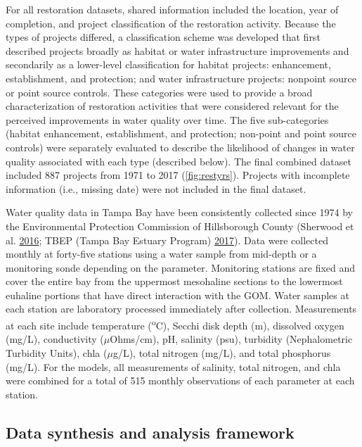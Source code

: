 \documentclass[]{article}
\begin{document}
For all restoration datasets, shared information included the location,
year of completion, and project classification of the restoration
activity. Because the types of projects differed, a classification
scheme was developed that first described projects broadly as habitat or
water infrastructure improvements and secondarily as a lower-level
classification for habitat projects: enhancement, establishment, and
protection; and water infrastructure projects: nonpoint source or point
source controls. These categories were used to provide a broad
characterization of restoration activities that were considered relevant
for the perceived improvements in water quality over time. The five
sub-categories (habitat enhancement, establishment, and protection;
non-point and point source controls) were separately evaluated to
describe the likelihood of changes in water quality associated with each
type (described below). The final combined dataset included 887 projects
from 1971 to 2017 (\cref{fig:restyrs}). Projects with incomplete
information (i.e., missing date) were not included in the final dataset.

Water quality data in Tampa Bay have been consistently collected since
1974 by the Environmental Protection Commission of Hillsborough County
(Sherwood et al. \protect\hyperlink{ref-Sherwood16}{2016}; TBEP (Tampa
Bay Estuary Program) \protect\hyperlink{ref-TBEP17}{2017}). Data were
collected monthly at forty-five stations using a water sample from
mid-depth or a monitoring sonde depending on the parameter. Monitoring
stations are fixed and cover the entire bay from the uppermost
mesohaline sections to the lowermost euhaline portions that have direct
interaction with the GOM. Water samples at each station are laboratory
processed immediately after collection. Measurements at each site
include temperature (\textsuperscript{o}C), Secchi disk depth (m),
dissolved oxygen (mg/L), conductivity (\(\mu\)Ohms/cm), pH, salinity
(psu), turbidity (Nephalometric Turbidity Units), \ac{chla}
(\(\mu\)g/L), total nitrogen (mg/L), and total phosphorus (mg/L). For
the models, all measurements of salinity, total nitrogen, and \ac{chla}
were combined for a total of 515 monthly observations of each parameter
at each station.

\hypertarget{data-synthesis-and-analysis-framework}{%
\subsection{Data synthesis and analysis
framework}\label{data-synthesis-and-analysis-framework}}
\end{document}
